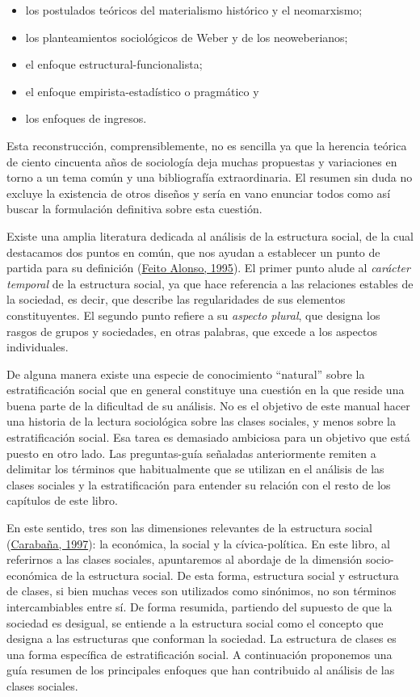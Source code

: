\documentclass[
]{article}
\providecommand{\tightlist}{%
  \setlength{\itemsep}{0pt}\setlength{\parskip}{0pt}}
\begin{document}
\begin{itemize}
\tightlist
\item
  los postulados teóricos del materialismo histórico y el neomarxismo;
\item
  los planteamientos sociológicos de Weber y de los neoweberianos;
\item
  el enfoque estructural-funcionalista;
\item
  el enfoque empirista-estadístico o pragmático y
\item
  los enfoques de ingresos.
\end{itemize}

Esta reconstrucción, comprensiblemente, no es sencilla ya que la herencia teórica de ciento cincuenta años de sociología deja muchas propuestas y variaciones en torno a un tema común y una bibliografía extraordinaria. El resumen sin duda no excluye la existencia de otros diseños y sería en vano enunciar todos como así buscar la formulación definitiva sobre esta cuestión.

Existe una amplia literatura dedicada al análisis de la estructura social, de la cual destacamos dos puntos en común, que nos ayudan a establecer un punto de partida para su definición (\protect\hyperlink{ref-FeitoAlonso1995}{Feito Alonso, 1995}). El primer punto alude al \emph{carácter temporal} de la estructura social, ya que hace referencia a las relaciones estables de la sociedad, es decir, que describe las regularidades de sus elementos constituyentes. El segundo punto refiere a su \emph{aspecto plural}, que designa los rasgos de grupos y sociedades, en otras palabras, que excede a los aspectos individuales.

De alguna manera existe una especie de conocimiento ``natural'' sobre la estratificación social que en general constituye una cuestión en la que reside una buena parte de la dificultad de su análisis. No es el objetivo de este manual hacer una historia de la lectura sociológica sobre las clases sociales, y menos sobre la estratificación social. Esa tarea es demasiado ambiciosa para un objetivo que está puesto en otro lado. Las preguntas-guía señaladas anteriormente remiten a delimitar los términos que habitualmente que se utilizan en el análisis de las clases sociales y la estratificación para entender su relación con el resto de los capítulos de este libro.

En este sentido, tres son las dimensiones relevantes de la estructura social (\protect\hyperlink{ref-Carabana1997}{Carabaña, 1997}): la económica, la social y la cívica-política. En este libro, al referirnos a las clases sociales, apuntaremos al abordaje de la dimensión socio-económica de la estructura social. De esta forma, estructura social y estructura de clases, si bien muchas veces son utilizados como sinónimos, no son términos intercambiables entre sí. De forma resumida, partiendo del supuesto de que la sociedad es desigual, se entiende a la estructura social como el concepto que designa a las estructuras que conforman la sociedad. La estructura de clases es una forma específica de estratificación social. A continuación proponemos una guía resumen de los principales enfoques que han contribuido al análisis de las clases sociales.
\end{document}
